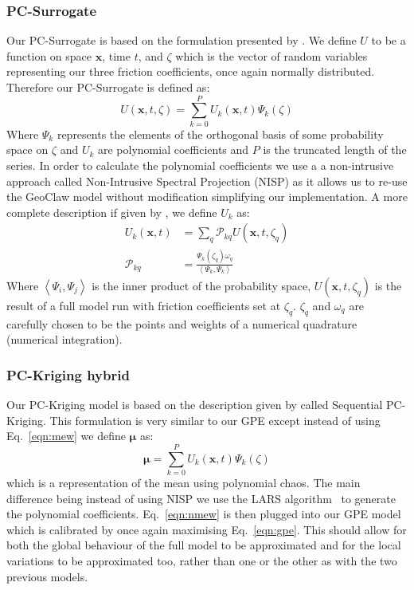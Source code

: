 \documentclass[12pt,a4paper]{article}
\begin{document}
\subsubsection{PC-Surrogate}
\noindent
Our PC-Surrogate is based on the formulation presented by . We define $U$ to be a function on space $\bm{x}$, time $t$, and $\zeta$ which is the vector of random variables representing our three friction coefficients, once again normally distributed. Therefore our PC-Surrogate is defined as:
\begin{equation}
	U(\bm{x},t,\zeta)=\sum_{k=0}^{P}U_k(\bm{x},t)\Psi_k(\zeta)
\end{equation}
Where $\Psi_k$ represents the elements of the orthogonal basis of some probability space on $\zeta$ and $U_k$ are polynomial coefficients and $P$ is the truncated length of the series. In order to calculate the polynomial coefficients we use a a non-intrusive approach called Non-Intrusive Spectral Projection (NISP) as it allows us to re-use the GeoClaw model without modification simplifying our implementation. A more complete description if given by , we define $U_k$ as:
\begin{align}
	U_k(\bm{x},t) &= \sum_{q}\mathcal{P}_{kq}U(\bm{x},t,\zeta_q) \\
	\mathcal{P}_{kq} &= \frac{\Psi_k(\zeta_q)\omega_q}{\left<\Psi_k, \Psi_k \right>}
\end{align}
Where $\left<\Psi_i,\Psi_j \right>$ is the inner product of the probability space, $U(\bm{x},t,\zeta_q)$ is the result of a full model run with friction coefficients set at $\zeta_q$. $\zeta_q$ and $\omega_q$ are carefully chosen to be the points and weights of a numerical quadrature (numerical integration).
\subsubsection{PC-Kriging hybrid}
\noindent
Our PC-Kriging model is based on the description given by  called Sequential PC-Kriging. This formulation is very similar to our GPE except instead of using Eq.~\eqref{eqn:mew} we define $\bm{\mu}$ as:
\begin{equation}\label{eqn:nmew}
	\bm{\mu} = \sum_{k=0}^{P}U_k(\bm{x},t)\Psi_k(\zeta)
\end{equation}
which is a representation of the mean using polynomial chaos. The main difference being instead of using NISP we use the LARS algorithm~\cite{lar} to generate the polynomial coefficients. Eq.~\eqref{eqn:nmew} is then plugged into our GPE model which is calibrated by once again maximising Eq.~\eqref{eqn:gpe}. This should allow for both the global behaviour of the full model to be approximated and for the local variations to be approximated too, rather than one or the other as with the two previous models.
\end{document}
